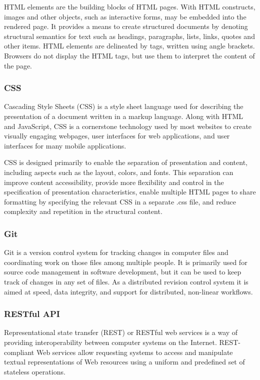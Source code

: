 \documentclass[BTech]{srmuthesis}
\begin{document}
HTML elements are the building blocks of HTML pages. With HTML constructs, images and other objects, such as interactive forms, may be embedded into the rendered page. It provides a means to create structured documents by denoting structural semantics for text such as headings, paragraphs, lists, links, quotes and other items. HTML elements are delineated by tags, written using angle brackets. Browsers do not display the HTML tags, but use them to interpret the content of the page.
\subsubsection{CSS}
Cascading Style Sheets (CSS) is a style sheet language used for describing the presentation of a document written in a markup language. Along with HTML and JavaScript, CSS is a cornerstone technology used by most websites to create visually engaging webpages, user interfaces for web applications, and user interfaces for many mobile applications.

CSS is designed primarily to enable the separation of presentation and content, including aspects such as the layout, colors, and fonts. This separation can improve content accessibility, provide more flexibility and control in the specification of presentation characteristics, enable multiple HTML pages to share formatting by specifying the relevant CSS in a separate .css file, and reduce complexity and repetition in the structural content.
\subsubsection{Git}
Git is a version control system for tracking changes in computer files and coordinating work on those files among multiple people. It is primarily used for source code management in software development, but it can be used to keep track of changes in any set of files. As a distributed revision control system it is aimed at speed, data integrity, and support for distributed, non-linear workflows.
\subsubsection{RESTful \ac{API}}
Representational state transfer (REST) or RESTful web services is a way of providing interoperability between computer systems on the Internet. REST-compliant Web services allow requesting systems to access and manipulate textual representations of Web resources using a uniform and predefined set of stateless operations.
\end{document}
